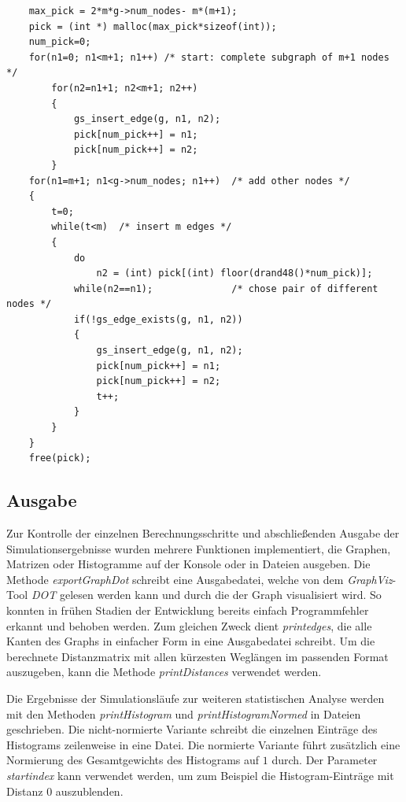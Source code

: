 \documentclass[10pt]{article}
\begin{document}
\begin{lstlisting}
    max_pick = 2*m*g->num_nodes- m*(m+1);
    pick = (int *) malloc(max_pick*sizeof(int));
    num_pick=0;
    for(n1=0; n1<m+1; n1++) /* start: complete subgraph of m+1 nodes */
        for(n2=n1+1; n2<m+1; n2++)
        {
            gs_insert_edge(g, n1, n2);
            pick[num_pick++] = n1;
            pick[num_pick++] = n2;
        }
    for(n1=m+1; n1<g->num_nodes; n1++)  /* add other nodes */
    {
        t=0;
        while(t<m)  /* insert m edges */
        {
            do
                n2 = (int) pick[(int) floor(drand48()*num_pick)];
            while(n2==n1);              /* chose pair of different nodes */
            if(!gs_edge_exists(g, n1, n2))
            {
                gs_insert_edge(g, n1, n2);
                pick[num_pick++] = n1;
                pick[num_pick++] = n2;
                t++;
            }
        }
    }
    free(pick);
\end{lstlisting}

\subsection{Ausgabe}
Zur Kontrolle der einzelnen Berechnungsschritte und abschließenden Ausgabe der Simulationsergebnisse wurden mehrere Funktionen implementiert, die Graphen, Matrizen oder Histogramme auf der Konsole oder in Dateien ausgeben. Die Methode \textit{exportGraphDot} schreibt eine Ausgabedatei, welche von dem \textit{GraphViz}-Tool \textit{DOT} gelesen werden kann und durch die der Graph visualisiert wird. So konnten in frühen Stadien der Entwicklung bereits einfach Programmfehler erkannt und behoben werden. Zum gleichen Zweck dient \textit{printedges}, die alle Kanten des Graphs in einfacher Form in eine Ausgabedatei schreibt. Um die berechnete Distanzmatrix mit allen kürzesten Weglängen im passenden Format auszugeben, kann die Methode \textit{printDistances} verwendet werden.

Die Ergebnisse der Simulationsläufe zur weiteren statistischen Analyse werden mit den Methoden \textit{printHistogram} und \textit{printHistogramNormed} in Dateien geschrieben. Die nicht-normierte Variante schreibt die einzelnen Einträge des Histograms zeilenweise in eine Datei. Die normierte Variante führt zusätzlich eine Normierung des Gesamtgewichts des Histograms auf $1$ durch. Der Parameter \textit{startindex} kann verwendet werden, um zum Beispiel die Histogram-Einträge mit Distanz 0 auszublenden.
\end{document}
